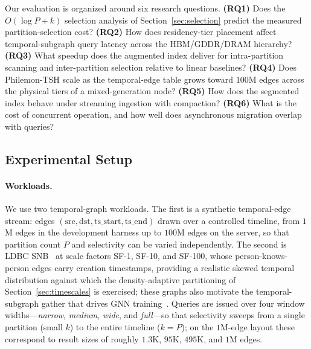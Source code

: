 \documentclass[10pt]{article}
\theoremstyle{definition}
\begin{document}
Our evaluation is organized around six research questions.
\textbf{(RQ1)} Does the $O(\log P + k)$ selection analysis of
Section~\ref{sec:selection} predict the measured partition-selection cost?
\textbf{(RQ2)} How does residency-tier placement affect temporal-subgraph query
latency across the HBM/GDDR/DRAM hierarchy?
\textbf{(RQ3)} What speedup does the augmented index deliver for intra-partition
scanning and inter-partition selection relative to linear baselines?
\textbf{(RQ4)} Does Philemon-TSH scale as the temporal-edge table grows toward
$100$M edges across the physical tiers of a mixed-generation node?
\textbf{(RQ5)} How does the segmented index behave under streaming ingestion with
compaction?
\textbf{(RQ6)} What is the cost of concurrent operation, and how well does
asynchronous migration overlap with queries?

\subsection{Experimental Setup}
\label{sec:setup}

\paragraph{Workloads.}
We use two temporal-graph workloads. The first is a synthetic temporal-edge stream:
edges $(\text{src},\text{dst},\text{ts\_start},\text{ts\_end})$ drawn over a
controlled timeline, from $1$M edges in the development harness up to $100$M edges
on the server, so that partition count $P$ and selectivity can be varied
independently. The second is LDBC SNB~\citep{erling2015ldbc} at scale factors SF-1,
SF-10, and SF-100, whose person-knows-person edges carry creation timestamps,
providing a realistic skewed temporal distribution against which the
density-adaptive partitioning of Section~\ref{sec:timescales} is exercised; these
graphs also motivate the temporal-subgraph gather that drives GNN
training~\citep{rossi2020tgn,hamilton2017graphsage}. Queries are issued over four
window widths---\emph{narrow}, \emph{medium}, \emph{wide}, and \emph{full}---so that
selectivity sweeps from a single partition (small $k$) to the entire timeline
($k=P$); on the $1$M-edge layout these correspond to result sizes of roughly
$1.3$K, $95$K, $495$K, and $1$M edges.
\end{document}
